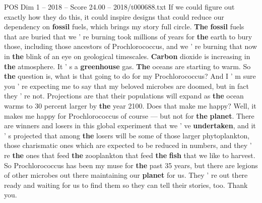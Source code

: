 \begin{textsample}{POS Dim 1 – 2018 – Score 24.00 – 2018/t000688.txt}
If we could figure out exactly how they do this, it could inspire designs that could reduce our dependency on \textbf{fossil} fuels, which brings my story full circle. \textbf{The} \textbf{fossil} fuels that are buried that we ' re burning took millions of years for \textbf{the} earth to bury those, including those ancestors of Prochlorococcus, and we ' re burning that now in \textbf{the} blink of an eye on geological timescales. \textbf{Carbon} dioxide is increasing in \textbf{the} atmosphere.
It ' s a \textbf{greenhouse} gas. \textbf{The} oceans are starting to warm.
So \textbf{the} question is, what is that going to do for my Prochlorococcus?
And I ' m sure you ' re expecting me to say that my beloved microbes are doomed, but in fact they ' re not.
Projections are that their populations will expand as \textbf{the} ocean warms to 30 percent larger by \textbf{the} year 2100.
Does that make me happy?
Well, it makes me happy for Prochlorococcus of course — but not for \textbf{the} \textbf{planet}.
There are winners and losers in this global experiment that we ' ve \textbf{undertaken}, and it ' s projected that among \textbf{the} losers will be some of those larger phytoplankton, those charismatic ones which are expected to be reduced in numbers, and they ' re \textbf{the} ones that feed \textbf{the} zooplankton that feed \textbf{the} \textbf{fish} that we like to harvest.
So Prochlorococcus has been my muse for \textbf{the} past 35 years, but there are legions of other microbes out there maintaining our \textbf{planet} for us.
They ' re out there ready and waiting for us to find them so they can tell their stories, too.
Thank you.

\end{textsample}
